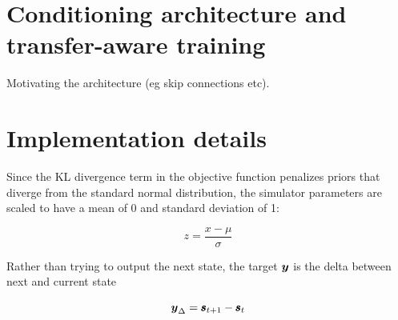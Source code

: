 
        
        

\section{Conditioning architecture and transfer-aware training}

Motivating the architecture (eg skip connections etc). 


\section{Implementation details}

Since the KL divergence term in the objective function penalizes priors that diverge from the standard normal distribution, the simulator parameters are scaled to have a mean of 0 and standard deviation of 1:

\begin{equation*}
    z = \frac{x - \mu}{\sigma}
\end{equation*}


Rather than trying to output the next state, the target $\boldsymbol{y}$ is the delta between next and current state

\begin{equation*}
    \boldsymbol{y}_{\Delta} = \pmb{s}_{t+1} - \pmb{s}_t
\end{equation*}



